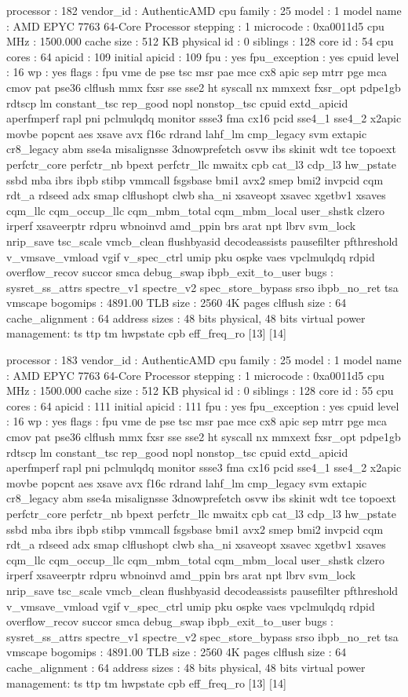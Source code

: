 processor	: 182
vendor_id	: AuthenticAMD
cpu family	: 25
model		: 1
model name	: AMD EPYC 7763 64-Core Processor
stepping	: 1
microcode	: 0xa0011d5
cpu MHz		: 1500.000
cache size	: 512 KB
physical id	: 0
siblings	: 128
core id		: 54
cpu cores	: 64
apicid		: 109
initial apicid	: 109
fpu		: yes
fpu_exception	: yes
cpuid level	: 16
wp		: yes
flags		: fpu vme de pse tsc msr pae mce cx8 apic sep mtrr pge mca cmov pat pse36 clflush mmx fxsr sse sse2 ht syscall nx mmxext fxsr_opt pdpe1gb rdtscp lm constant_tsc rep_good nopl nonstop_tsc cpuid extd_apicid aperfmperf rapl pni pclmulqdq monitor ssse3 fma cx16 pcid sse4_1 sse4_2 x2apic movbe popcnt aes xsave avx f16c rdrand lahf_lm cmp_legacy svm extapic cr8_legacy abm sse4a misalignsse 3dnowprefetch osvw ibs skinit wdt tce topoext perfctr_core perfctr_nb bpext perfctr_llc mwaitx cpb cat_l3 cdp_l3 hw_pstate ssbd mba ibrs ibpb stibp vmmcall fsgsbase bmi1 avx2 smep bmi2 invpcid cqm rdt_a rdseed adx smap clflushopt clwb sha_ni xsaveopt xsavec xgetbv1 xsaves cqm_llc cqm_occup_llc cqm_mbm_total cqm_mbm_local user_shstk clzero irperf xsaveerptr rdpru wbnoinvd amd_ppin brs arat npt lbrv svm_lock nrip_save tsc_scale vmcb_clean flushbyasid decodeassists pausefilter pfthreshold v_vmsave_vmload vgif v_spec_ctrl umip pku ospke vaes vpclmulqdq rdpid overflow_recov succor smca debug_swap ibpb_exit_to_user
bugs		: sysret_ss_attrs spectre_v1 spectre_v2 spec_store_bypass srso ibpb_no_ret tsa vmscape
bogomips	: 4891.00
TLB size	: 2560 4K pages
clflush size	: 64
cache_alignment	: 64
address sizes	: 48 bits physical, 48 bits virtual
power management: ts ttp tm hwpstate cpb eff_freq_ro [13] [14]

processor	: 183
vendor_id	: AuthenticAMD
cpu family	: 25
model		: 1
model name	: AMD EPYC 7763 64-Core Processor
stepping	: 1
microcode	: 0xa0011d5
cpu MHz		: 1500.000
cache size	: 512 KB
physical id	: 0
siblings	: 128
core id		: 55
cpu cores	: 64
apicid		: 111
initial apicid	: 111
fpu		: yes
fpu_exception	: yes
cpuid level	: 16
wp		: yes
flags		: fpu vme de pse tsc msr pae mce cx8 apic sep mtrr pge mca cmov pat pse36 clflush mmx fxsr sse sse2 ht syscall nx mmxext fxsr_opt pdpe1gb rdtscp lm constant_tsc rep_good nopl nonstop_tsc cpuid extd_apicid aperfmperf rapl pni pclmulqdq monitor ssse3 fma cx16 pcid sse4_1 sse4_2 x2apic movbe popcnt aes xsave avx f16c rdrand lahf_lm cmp_legacy svm extapic cr8_legacy abm sse4a misalignsse 3dnowprefetch osvw ibs skinit wdt tce topoext perfctr_core perfctr_nb bpext perfctr_llc mwaitx cpb cat_l3 cdp_l3 hw_pstate ssbd mba ibrs ibpb stibp vmmcall fsgsbase bmi1 avx2 smep bmi2 invpcid cqm rdt_a rdseed adx smap clflushopt clwb sha_ni xsaveopt xsavec xgetbv1 xsaves cqm_llc cqm_occup_llc cqm_mbm_total cqm_mbm_local user_shstk clzero irperf xsaveerptr rdpru wbnoinvd amd_ppin brs arat npt lbrv svm_lock nrip_save tsc_scale vmcb_clean flushbyasid decodeassists pausefilter pfthreshold v_vmsave_vmload vgif v_spec_ctrl umip pku ospke vaes vpclmulqdq rdpid overflow_recov succor smca debug_swap ibpb_exit_to_user
bugs		: sysret_ss_attrs spectre_v1 spectre_v2 spec_store_bypass srso ibpb_no_ret tsa vmscape
bogomips	: 4891.00
TLB size	: 2560 4K pages
clflush size	: 64
cache_alignment	: 64
address sizes	: 48 bits physical, 48 bits virtual
power management: ts ttp tm hwpstate cpb eff_freq_ro [13] [14]

